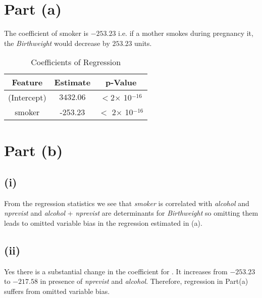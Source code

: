 \documentclass{./solution}
\begin{document}
    \begin{solution}
        \section*{Part (a)}
            The coefficient of smoker is $-253.23$ i.e. if a mother smokes during 
            pregnancy it, the \textit{Birthweight} would decrease by $253.23$ units.

        
            \begin{table}[H]
                \caption{Coefficients of Regression}
                \begin{tabularx}{\textwidth}{C C C}
                    \toprule
                    Feature & Estimate & p-Value \\
                    \midrule
                    (Intercept) & $3432.06$ &  $<$2$\times$ 10$^{-16}$ \\
                    smoker         &  -253.23 &   $<$ 2$\times$ 10$^{-16}$ \\
                    
                    \bottomrule
                \end{tabularx}
            \end{table}
            \vspace{-5mm}
            
        \section*{Part (b)}
            \subsection*{  (i)}
            From the regression statistics we see that \textit{smoker} is correlated with \textit{alcohol} and \textit{nprevist} and \textit{alcohol} + \textit{nprevist} are determinants for \textit{Birthweight} so omitting 
            them leads to  omitted variable bias in the regression estimated in (a).
            
            \subsection*{ (ii)}
            Yes there is a substantial change in the coefficient for .
            It increases from $-253.23$ to $-217.58$ in presence of \textit{nprevist} and \textit{alcohol}. Therefore, regression in Part(a)
            suffers from omitted variable bias.
            

\end{solution}
\end{document}
